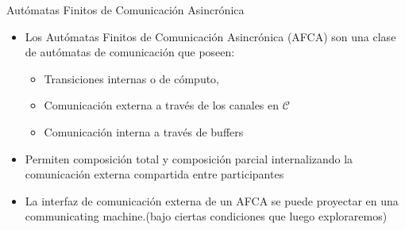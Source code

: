 \documentclass[10pt,xcolor={table,dvipsnames},t]{beamer}
\begin{document}
\begin{frame}{Autómatas Finitos de Comunicación Asincrónica}
\begin{itemize}
    \item Los Autómatas Finitos de Comunicación Asincrónica (AFCA) son una clase de autómatas de comunicación que poseen:
    \begin{itemize}
        \item Transiciones internas o de cómputo,
        \item Comunicación externa a través de los canales en $\mathcal{C}$
        \item Comunicación interna a través de buffers
    \end{itemize} 
    \item Permiten composición total y composición parcial internalizando la comunicación externa compartida entre participantes
    \item La interfaz de comunicación externa de un AFCA se puede proyectar en una communicating machine.(bajo ciertas condiciones que luego exploraremos)
\end{itemize}
\end{frame}
\end{document}
